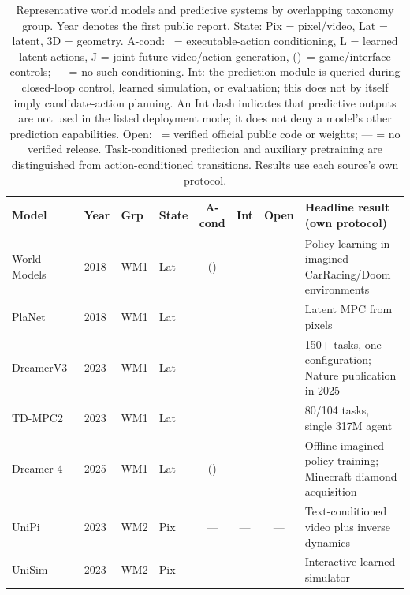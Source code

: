 \documentclass{ieeeaccess}
\newcommand{\cmark}{\ding{51}}
\begin{document}
\begin{table}[!t]
\caption{Representative world models and predictive systems by overlapping
taxonomy group. Year denotes the first public report. State: Pix = pixel/video,
Lat = latent, 3D = geometry. A-cond: \cmark~= executable-action conditioning,
L = learned latent actions, J = joint future video/action generation,
(\cmark)~= game/interface controls; --- = no such conditioning.
Int: the prediction module is queried during closed-loop control, learned
simulation, or evaluation; this does not by itself imply candidate-action planning.
\textcolor[RGB]{104,48,148}{An Int dash indicates that predictive outputs are not used in the listed deployment mode; it does not deny a model's other prediction capabilities.}
Open: \cmark~= verified official public code or weights; --- = no verified release.
Task-conditioned prediction and auxiliary pretraining are distinguished from
action-conditioned transitions. Results use each source's own protocol.}
\label{tab:wm-master}
\centering
\scriptsize
\setlength{\tabcolsep}{3.5pt}
\begin{tabular}{p{2.7cm}p{1.35cm}p{0.9cm}p{1.2cm}cccp{5.9cm}}
\toprule
Model & Year & Grp & State & A-cond & Int & Open & Headline result (own protocol) \\
\midrule
World Models~\cite{worldmodels2018} & 2018 & WM1 & Lat & (\cmark) & \cmark & \cmark & Policy learning in imagined CarRacing/Doom environments \\
PlaNet~\cite{planet} & 2018 & WM1 & Lat & \cmark & \cmark & \cmark & Latent MPC from pixels \\
DreamerV3~\cite{dreamerv3} & 2023 & WM1 & Lat & \cmark & \cmark & \cmark & 150+ tasks, one configuration; Nature publication in 2025 \\
TD-MPC2~\cite{tdmpc2} & 2023 & WM1 & Lat & \cmark & \cmark & \cmark & 80/104 tasks, single 317M agent \\
Dreamer 4~\cite{dreamer4} & 2025 & WM1 & Lat & (\cmark) & \cmark & --- & Offline imagined-policy training; Minecraft diamond acquisition \\
UniPi~\cite{unipi} & 2023 & WM2 & Pix & --- & --- & --- & Text-conditioned video plus inverse dynamics \\
UniSim~\cite{unisim} & 2023 & WM2 & Pix & \cmark & \cmark & --- & Interactive learned simulator \\

\end{tabular}
\end{table}
\end{document}
